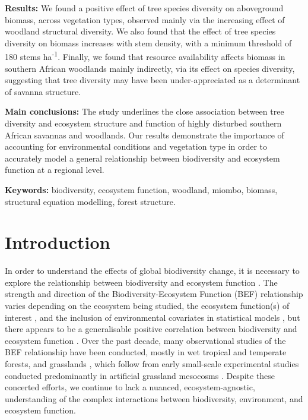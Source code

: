 \documentclass[11pt,a4paper]{article}
\newcommand{\textapprox}{\raisebox{0.5ex}{\texttildelow}}  %
\begin{document}
\textbf{Results:} We found a positive effect of tree species diversity on aboveground biomass, across vegetation types, observed mainly via the increasing effect of woodland structural diversity. We also found that the effect of tree species diversity on biomass increases with stem density, with a minimum threshold of \textapprox{}180 stems ha\textsuperscript{-1}. Finally, we found that resource availability affects biomass in southern African woodlands mainly indirectly, via its effect on species diversity, suggesting that tree diversity may have been under-appreciated as a determinant of savanna structure.

\textbf{Main conclusions:} The study underlines the close association between tree diversity and ecosystem structure and function of highly disturbed southern African savannas and woodlands. Our results demonstrate the importance of accounting for environmental conditions and vegetation type in order to accurately model a general relationship between biodiversity and ecosystem function at a regional level. 

\textbf{Keywords:} biodiversity, ecosystem function, woodland, miombo, biomass, structural equation modelling, forest structure.

\section{Introduction}

In order to understand the effects of global biodiversity change, it is necessary to explore the relationship between biodiversity and ecosystem function \citep{Tilman2014}. The strength and direction of the Biodiversity-Ecosystem Function (BEF) relationship varies depending on the ecosystem being studied, the ecosystem function(s) of interest \citep{Hector2007}, and the inclusion of environmental covariates in statistical models \citep{Vila2005}, but there appears to be a generalisable positive correlation between biodiversity and ecosystem function \citep{Liang2016, Hooper2012, Cardinale2009}. Over the past decade, many observational studies of the BEF relationship have been conducted, mostly in wet tropical and temperate forests, and grasslands \citep{Chen2011}, which follow from early small-scale experimental studies conducted predominantly in artificial grassland mesocosms \citep{Tilman1994, Tilman2014}. Despite these concerted efforts, we continue to lack a nuanced, ecosystem-agnostic, understanding of the complex interactions between biodiversity, environment, and ecosystem function.
\end{document}
